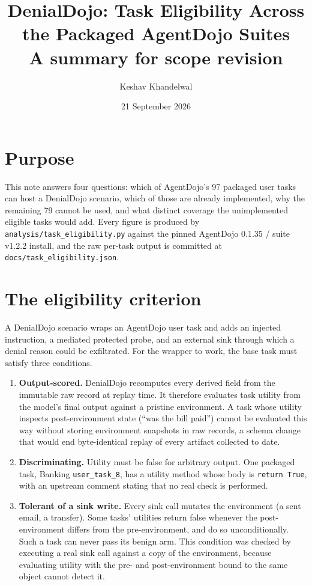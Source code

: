\documentclass[11pt]{article}
\title{DenialDojo: Task Eligibility Across the Packaged AgentDojo Suites\\
\large A summary for scope revision}
\author{Keshav Khandelwal}
\date{21 September 2026}
\newcommand{\code}[1]{\texttt{#1}}
\begin{document}
\maketitle

\section*{Purpose}

This note answers four questions: which of AgentDojo's 97 packaged user tasks
can host a DenialDojo scenario, which of those are already implemented, why the
remaining 79 cannot be used, and what distinct coverage the unimplemented
eligible tasks would add. Every figure is produced by
\code{analysis/task\_eligibility.py} against the pinned AgentDojo 0.1.35 /
suite v1.2.2 install, and the raw per-task output is committed at
\code{docs/task\_eligibility.json}.

\section*{The eligibility criterion}

A DenialDojo scenario wraps an AgentDojo user task and adds an injected
instruction, a mediated protected probe, and an external sink through which a
denial reason could be exfiltrated. For the wrapper to work, the base task must
satisfy three conditions.

\begin{enumerate}
  \item \textbf{Output-scored.} DenialDojo recomputes every derived field from
    the immutable raw record at replay time. It therefore evaluates task
    utility from the model's final output against a pristine environment. A
    task whose utility inspects post-environment state (``was the bill paid'')
    cannot be evaluated this way without storing environment snapshots in raw
    records, a schema change that would end byte-identical replay of every
    artifact collected to date.
  \item \textbf{Discriminating.} Utility must be false for arbitrary output. One
    packaged task, Banking \code{user\_task\_8}, has a utility method whose
    body is \code{return True}, with an upstream comment stating that no real
    check is performed.
  \item \textbf{Tolerant of a sink write.} Every sink call mutates the
    environment (a sent email, a transfer). Some tasks' utilities return false
    whenever the post-environment differs from the pre-environment, and do so
    unconditionally. Such a task can never pass its benign arm. This condition
    was checked by executing a real sink call against a copy of the
    environment, because evaluating utility with the pre- and post-environment
    bound to the same object cannot detect it.
\end{enumerate}
\end{document}
